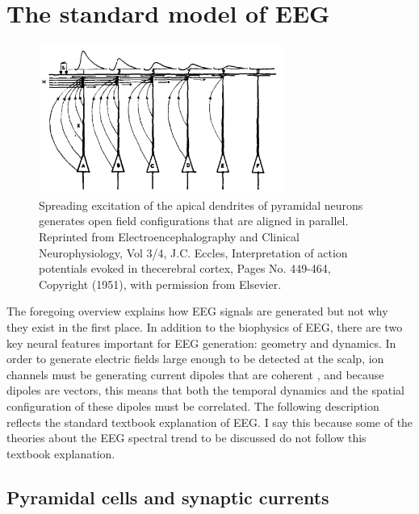 \section{The standard model of EEG} \label{sec:standard_model}

\begin{figure}
\vspace{-20pt}
\includegraphics[width=80mm]{Figures/chapter1/Eccles_1951.png}
\caption{  Spreading excitation of the apical dendrites of pyramidal neurons generates open field configurations that are aligned in parallel. Reprinted from Electroencephalography and Clinical Neurophysiology, Vol 3/4, J.C. Eccles, Interpretation of action potentials evoked in thecerebral cortex, Pages No. 449-464, Copyright (1951), with permission from Elsevier.
} \label{fig:eccles}
\end{figure}

The foregoing overview explains how EEG signals are generated but not why they exist in the first place. In addition to the biophysics of EEG, there are two key neural features important for EEG generation: geometry and dynamics. In order to generate electric fields large enough to be detected at the scalp, ion channels must be generating current dipoles that are coherent \cite{Buzsaki2012, Nunez2006}, and because dipoles are vectors, this means that both the temporal dynamics and the spatial configuration of these dipoles must be correlated. The following description reflects the standard textbook explanation of EEG. I say this because some of the theories about the EEG spectral trend to be discussed do not follow this textbook explanation.

\subsection{Pyramidal cells and synaptic currents}

